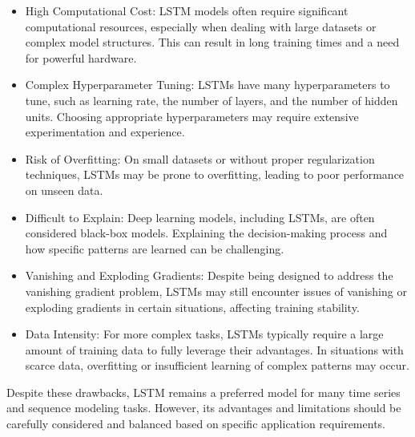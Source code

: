 \documentclass[12pt]{article}  %
\begin{document}
\begin{spacing}{1.2}
\begin{enumerate}
{\begin{tcolorbox}[colback=gray!5, boxrule=0pt]
            \begin{itemize}
                \item High Computational Cost: LSTM models often require significant computational resources, especially when dealing with large datasets or complex model structures. This can result in long training times and a need for powerful hardware.
                
                \item Complex Hyperparameter Tuning: LSTMs have many hyperparameters to tune, such as learning rate, the number of layers, and the number of hidden units. Choosing appropriate hyperparameters may require extensive experimentation and experience.
                
                \item Risk of Overfitting: On small datasets or without proper regularization techniques, LSTMs may be prone to overfitting, leading to poor performance on unseen data.
                
                \item Difficult to Explain: Deep learning models, including LSTMs, are often considered black-box models. Explaining the decision-making process and how specific patterns are learned can be challenging.
                
                \item Vanishing and Exploding Gradients: Despite being designed to address the vanishing gradient problem, LSTMs may still encounter issues of vanishing or exploding gradients in certain situations, affecting training stability.
                
                \item Data Intensity: For more complex tasks, LSTMs typically require a large amount of training data to fully leverage their advantages. In situations with scarce data, overfitting or insufficient learning of complex patterns may occur.
            \end{itemize}
            
            Despite these drawbacks, LSTM remains a preferred model for many time series and sequence modeling tasks. However, its advantages and limitations should be carefully considered and balanced based on specific application requirements.
            \end{tcolorbox}
        }

    \end{enumerate}
\end{spacing}
\end{document}
